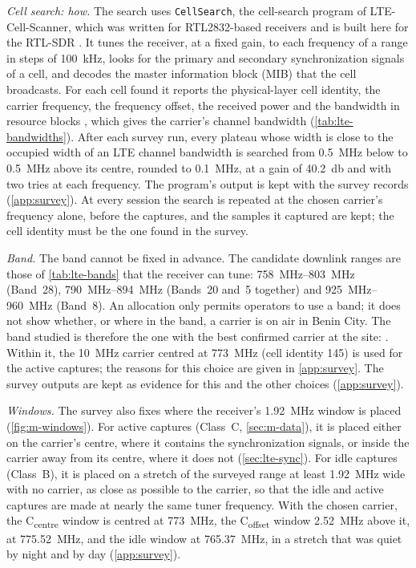 \emph{Cell search: how.} The search uses \texttt{CellSearch}, the cell-search program of LTE-Cell-Scanner, which was written for RTL2832-based receivers and is built here for the RTL-SDR \parencite{peroulas2024}. It tunes the receiver, at a fixed gain, to each frequency of a range in steps of \qty{100}{\kilo\hertz}, looks for the primary and secondary synchronization signals of a cell, and decodes the master information block (MIB) that the cell broadcasts. For each cell found it reports the physical-layer cell identity, the carrier frequency, the frequency offset, the received power and the bandwidth in resource blocks \parencite{peroulas2024}, which gives the carrier's channel bandwidth (\cref{tab:lte-bandwidths}). After each survey run, every plateau whose width is close to the occupied width of an LTE channel bandwidth is searched from \qty{0.5}{\mega\hertz} below to \qty{0.5}{\mega\hertz} above its centre, rounded to \qty{0.1}{\mega\hertz}, at a gain of \qty{40.2}{\decibel} and with two tries at each frequency. The program's output is kept with the survey records (\cref{app:survey}). At every session the search is repeated at the chosen carrier's frequency alone, before the captures, and the samples it captured are kept; the cell identity must be the one found in the survey.

\emph{Band.} The band cannot be fixed in advance. The candidate downlink ranges are those of \cref{tab:lte-bands} that the receiver can tune: \qtyrange{758}{803}{\mega\hertz} (Band~28), \qtyrange{790}{894}{\mega\hertz} (Bands~20 and~5 together) and \qtyrange{925}{960}{\mega\hertz} (Band~8). An allocation only permits operators to use a band; it does not show whether, or where in the band, a carrier is on air in Benin City. The band studied is therefore the one with the best confirmed carrier at the site: \TargetBand. Within it, the \qty{10}{\mega\hertz} carrier centred at \qty{773}{\mega\hertz} (cell identity 145) is used for the active captures; the reasons for this choice are given in \cref{app:survey}. The survey outputs are kept as evidence for this and the other choices (\cref{app:survey}).

\emph{Windows.} The survey also fixes where the receiver's \qty{1.92}{\mega\hertz} window is placed (\cref{fig:m-windows}). For active captures (Class~C, \cref{sec:m-data}), it is placed either on the carrier's centre, where it contains the synchronization signals, or inside the carrier away from its centre, where it does not (\cref{sec:lte-sync}). For idle captures (Class~B), it is placed on a stretch of the surveyed range at least \qty{1.92}{\mega\hertz} wide with no carrier, as close as possible to the carrier, so that the idle and active captures are made at nearly the same tuner frequency. With the chosen carrier, the C\textsubscript{centre} window is centred at \qty{773}{\mega\hertz}, the C\textsubscript{offset} window \qty{2.52}{\mega\hertz} above it, at \qty{775.52}{\mega\hertz}, and the idle window at \qty{765.37}{\mega\hertz}, in a stretch that was quiet by night and by day (\cref{app:survey}).

